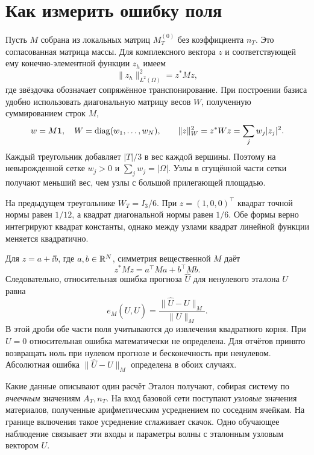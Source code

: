 \section{Как измерить ошибку поля}
Пусть $M$ собрана из локальных матриц $M_T^{(0)}$ без коэффициента $n_T$.
Это согласованная матрица массы. Для комплексного вектора $z$ и
соответствующей ему конечно-элементной функции $z_h$ имеем
\begin{equation}
 \|z_h\|_{L^2(\Omega)}^2=z^*Mz,\label{math:consistent-norm}
\end{equation}
где звёздочка обозначает сопряжённое транспонирование. При построении
базиса удобно использовать диагональную матрицу весов $W$, полученную
суммированием строк $M$,
\begin{equation}
 w=M\bm1,\quad W=\operatorname{diag}(w_1,\ldots,w_N),\qquad
 \|z\|_W^2=z^*Wz=\sum_jw_j|z_j|^2.\label{math:lumped-norm}
\end{equation}
Каждый треугольник добавляет $|T|/3$ в вес каждой вершины. Поэтому на
невырожденной сетке $w_j>0$ и $\sum_jw_j=|\Omega|$. Узлы в сгущённой
части сетки получают меньший вес, чем узлы с большой прилегающей площадью.

На предыдущем треугольнике $W_T=I_3/6$. При $z=(1,0,0)^\top$ квадрат
точной нормы равен $1/12$, а квадрат диагональной нормы равен $1/6$.
Обе формы верно интегрируют квадрат константы, однако между узлами
квадрат линейной функции меняется квадратично.

Для $z=a+\ii b$, где $a,b\in\mathbb{R}^N$, симметрия вещественной $M$ даёт
\begin{equation}
 z^*Mz=a^\top Ma+b^\top Mb.\label{math:complex-norm}
\end{equation}
Следовательно, относительная ошибка прогноза $\widehat U$ для
ненулевого эталона $U$ равна
\begin{equation}
 e_M(U,\widehat U)=
 \frac{\|\widehat U-U\|_M}{\|U\|_M}.\label{math:relative-error}
\end{equation}
В этой дроби обе части поля учитываются до извлечения квадратного корня.
При $U=0$ относительная ошибка математически не определена. Для отчётов
принято возвращать ноль при нулевом прогнозе и бесконечность при ненулевом.
Абсолютная ошибка $\|\widehat U-U\|_M$ определена в обоих случаях.

\begin{idea}{Какие данные описывают один расчёт}
Эталон получают, собирая систему по \emph{ячеечным} значениям $A_T,n_T$.
На вход базовой сети поступают \emph{узловые} значения материалов,
полученные арифметическим усреднением по соседним ячейкам. На границе
включения такое усреднение сглаживает скачок. Одно обучающее наблюдение
связывает эти входы и параметры волны с эталонным узловым вектором $U$.
\end{idea}

